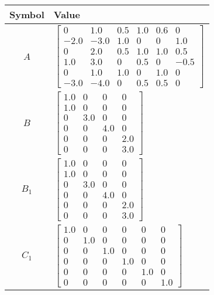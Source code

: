 \begin{tabular}{cl}
\hline
  Symbol  & Value                                                                                                                                                                                                                                  \\
\hline
   $A$    & $\left[\begin{matrix}0 & 1.0 & 0.5 & 1.0 & 0.6 & 0\\-2.0 & -3.0 & 1.0 & 0 & 0 & 1.0\\0 & 2.0 & 0.5 & 1.0 & 1.0 & 0.5\\1.0 & 3.0 & 0 & 0.5 & 0 & -0.5\\0 & 1.0 & 1.0 & 0 & 1.0 & 0\\-3.0 & -4.0 & 0 & 0.5 & 0.5 & 0\end{matrix}\right]$ \\
   $B$    & $\left[\begin{matrix}1.0 & 0 & 0 & 0\\1.0 & 0 & 0 & 0\\0 & 3.0 & 0 & 0\\0 & 0 & 4.0 & 0\\0 & 0 & 0 & 2.0\\0 & 0 & 0 & 3.0\end{matrix}\right]$                                                                                          \\
 $B_{1}$  & $\left[\begin{matrix}1.0 & 0 & 0 & 0\\1.0 & 0 & 0 & 0\\0 & 3.0 & 0 & 0\\0 & 0 & 4.0 & 0\\0 & 0 & 0 & 2.0\\0 & 0 & 0 & 3.0\end{matrix}\right]$                                                                                          \\
 $C_{1}$  & $\left[\begin{matrix}1.0 & 0 & 0 & 0 & 0 & 0\\0 & 1.0 & 0 & 0 & 0 & 0\\0 & 0 & 1.0 & 0 & 0 & 0\\0 & 0 & 0 & 1.0 & 0 & 0\\0 & 0 & 0 & 0 & 1.0 & 0\\0 & 0 & 0 & 0 & 0 & 1.0\end{matrix}\right]$                                          \\

\end{tabular}
